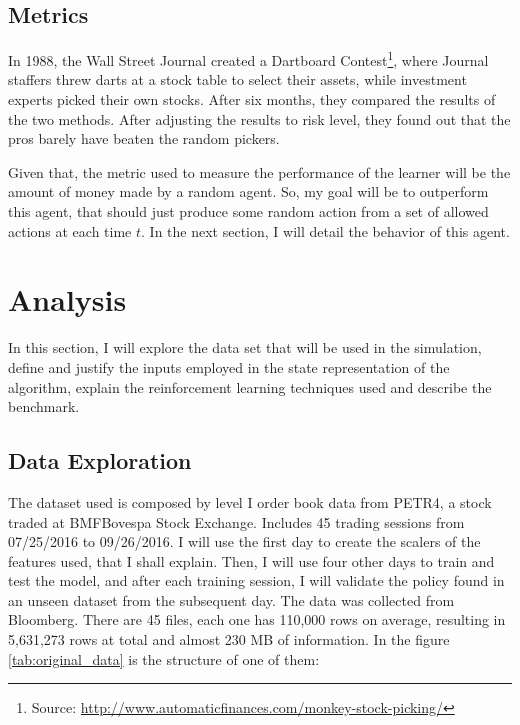 \documentclass[a4paper]{article}
\begin{document}
\subsection{Metrics}
In 1988, the Wall Street Journal created a Dartboard Contest\footnote{Source: \url{http://www.automaticfinances.com/monkey-stock-picking/}}, where Journal staffers threw darts at a stock table to select their assets, while investment experts picked their own stocks. After six months, they compared the results of the two methods. After adjusting the results to risk level, they found out that the pros barely have beaten the random pickers.

Given that, the metric used to measure the performance of the learner will be the amount of money made by a random agent. So, my goal will be to outperform this agent, that should just produce some random action from a set of allowed actions at each time $t$. In the next section, I will detail the behavior of this agent.


\section{Analysis}
\label{sec:analysis}

In this section, I will explore the data set that will be used in the simulation, define and justify the inputs employed in the state representation of the algorithm, explain the reinforcement learning techniques used and describe the benchmark.

\subsection{Data Exploration}
The dataset used is composed by level I order book data from PETR4, a stock traded at BMFBovespa Stock Exchange. Includes 45 trading sessions from 07/25/2016 to 09/26/2016. I will use the first day to create the scalers of the features used, that I shall explain. Then, I will use four other days to train and test the model, and after each training session, I will validate the policy found in an unseen dataset from the subsequent day. The data was collected from Bloomberg. There are 45 files, each one has 110,000 rows on average, resulting in 5,631,273 rows at total and almost  230 MB of information. In the figure \ref{tab:original_data} is the structure of one of them:
\end{document}

